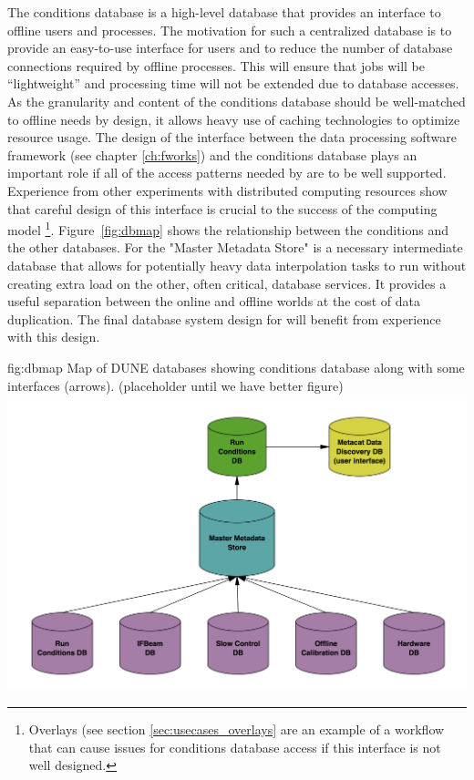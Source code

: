 \documentclass[../main-v1.tex]{subfiles}
\begin{document}
The conditions database is a high-level database that provides an interface to offline users and processes. The motivation for such a centralized database is to provide an easy-to-use interface for users and to reduce the number of database connections required by offline processes. This will ensure that jobs will be ``lightweight'' and processing time will not be extended due to database accesses. 
As the granularity and content of the conditions database should be well-matched to offline needs by design, it allows heavy use of caching technologies to optimize resource usage.  
The design of the interface between the data processing software framework (see chapter \ref{ch:fworks}) and the conditions database plays an important role if all of the access patterns needed by  are to be well supported.
Experience from other  experiments with distributed computing resources show that careful design of this interface is crucial to the success of the computing model
\footnote{Overlays (see section \ref{sec:usecases_overlays} are an example of a workflow that can cause issues for conditions database access if this interface is not well designed.}.
Figure~\ref{fig:dbmap} shows the relationship between the conditions  and the other  databases. For  the "Master Metadata Store" is a necessary intermediate database that allows for potentially heavy data interpolation tasks to run without creating extra load on the other, often critical, database services.  It provides a useful separation between the online and offline worlds at the cost of data duplication. The final database system design for  will benefit from experience with this design.


\begin{dunefigure}
{fig:dbmap} 
{Map of DUNE databases showing conditions database along with some interfaces (arrows). (placeholder until we have better figure)}
\includegraphics[width=.9\columnwidth]{graphics/Databases/DBSystem-cartoon.png}
\end{dunefigure}
\end{document}
